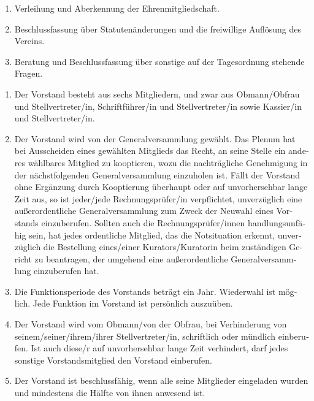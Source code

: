 \begin{otherlanguage}{german}
\begin{enumerate}[statutenenum]
    \item Verleihung und Aberkennung der Ehrenmitgliedschaft.

    \item Beschlussfassung über Statutenänderungen und die freiwillige Auflösung des Vereins.

    \item Beratung und Beschlussfassung über sonstige auf der Tagesordnung stehende Fragen.
\end{enumerate}


\begin{enumerate}[statutenenum]
    \item Der Vorstand besteht aus sechs Mitgliedern, und zwar aus Obmann/Obfrau und Stellvertreter/in, Schriftführer/in und Stellvertreter/in sowie Kassier/in und Stellvertreter/in.

    \item Der Vorstand wird von der Generalversammlung gewählt.
        Das Plenum hat bei Ausscheiden eines gewählten Mitglieds das Recht, an seine Stelle ein anderes wählbares Mitglied zu kooptieren, wozu die nachträgliche Genehmigung in der nächstfolgenden Generalversammlung einzuholen ist.
        Fällt der Vorstand ohne Ergänzung durch Kooptierung überhaupt oder auf unvorhersehbar lange Zeit aus, so ist jeder/jede Rechnungsprüfer/in verpflichtet, unverzüglich eine außerordentliche Generalversammlung zum Zweck der Neuwahl eines Vorstands einzuberufen.
        Sollten auch die Rechnungsprüfer/innen handlungsunfähig sein, hat jedes ordentliche Mitglied, das die Notsituation erkennt, unverzüglich die Bestellung eines/einer Kurators/Kuratorin beim zuständigen Gericht zu beantragen, der umgehend eine außerordentliche Generalversammlung einzuberufen hat.

    \item Die Funktionsperiode des Vorstands beträgt ein Jahr.
        Wiederwahl ist möglich.
        Jede Funktion im Vorstand ist persönlich auszuüben.

    \item Der Vorstand wird vom Obmann/von der Obfrau, bei Verhinderung von seinem/seiner/ihrem/ihrer Stellvertreter/in, schriftlich oder mündlich einberufen.
        Ist auch diese/r auf unvorhersehbar lange Zeit verhindert, darf jedes sonstige Vorstandsmitglied den Vorstand einberufen.

    \item Der Vorstand ist beschlussfähig, wenn alle seine Mitglieder eingeladen wurden und mindestens die Hälfte von ihnen anwesend ist.


\end{enumerate}
\end{otherlanguage}
